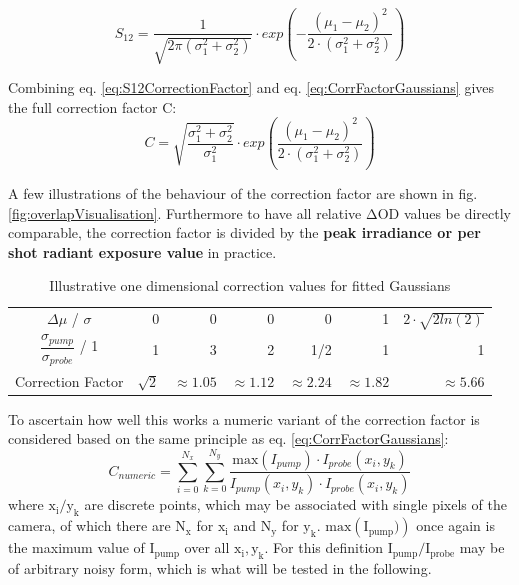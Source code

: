 \documentclass[twoside,openright]{scrreprt}
\begin{document}
\begin{equation}\label{eq:S12CorrectionFactor}
S_{12} = \dfrac{1}{\sqrt{2\pi\left(\sigma_1^2+\sigma_2^2\right)}}\cdot exp\left(-\dfrac{\left(\mu_1 - \mu_2\right)^2}{2\cdot \left(\sigma_1^2+\sigma_2^2\right)}\right)
\end{equation}

Combining eq. \ref{eq:S12CorrectionFactor} and eq. \ref{eq:CorrFactorGaussians} gives the full correction factor C:
\begin{equation}\label{eq:fullCorrectionFactor}
C = \sqrt{\frac{\sigma_1^2+\sigma_2^2}{\sigma_1^2}}\cdot exp \left(\frac{\left(\mu_1-\mu_2\right)^2}{2\cdot \left(\sigma_1^2+\sigma_2^2\right)}\right)
\end{equation}

A few illustrations of the behaviour of the correction factor are shown in fig. \ref{fig:overlapVisualisation}. Furthermore to have all relative $\mathrm{\Delta OD}$ values be directly comparable, the correction factor is divided by the \textbf{peak irradiance or per shot radiant exposure value} in practice.

\begin{table}[h]
\caption{Illustrative one dimensional correction values for fitted Gaussians}
\centering
\begin{tabular}{c|rrrrrr}\toprule
$\Delta \mu$ / $\sigma$                     & 0          & 0             & 0              & 0             & 1              & $2\cdot\sqrt{2 ln(2)}$ \\
$\dfrac{\sigma_{pump}}{\sigma_{probe}}$ / 1 & 1          & 3             & 2              & 1/2           & 1              & 1                      \\
Correction Factor                           & $\sqrt{2}$ & $\approx1.05$ & $\approx 1.12$ & $\approx 2.24$ & $\approx 1.82$ & $\approx 5.66$ \\ \bottomrule       
\end{tabular}
\end{table}


To ascertain how well this works a numeric variant of the correction factor is considered based on the same principle as eq. \ref{eq:CorrFactorGaussians}:
\begin{equation*}
C_{numeric} = \sum_{i=0}^{N_x}\sum_{k=0}^{N_y}\frac{\mathrm{max}\left(I_{pump}\right)\cdot I_{probe}(x_i,y_k)}{I_{pump}(x_i,y_k)\cdot I_{probe}(x_i,y_k)}
\end{equation*}
where $\mathrm{x_i/y_k}$ are discrete points, which may be associated with single pixels of the camera, of which there are $\mathrm{N_x}$ for $\mathrm{x_i}$ and $\mathrm{N_y}$ for $\mathrm{y_k}$. $\mathrm{max\left(I_{pump})\right)}$ once again is the maximum value of $\mathrm{I_{pump}}$ over all $\mathrm{x_i, y_k}$. For this definition $\mathrm{I_{pump}/I_{probe}}$ may be of arbitrary noisy form, which is what will be tested in the following.
\end{document}
